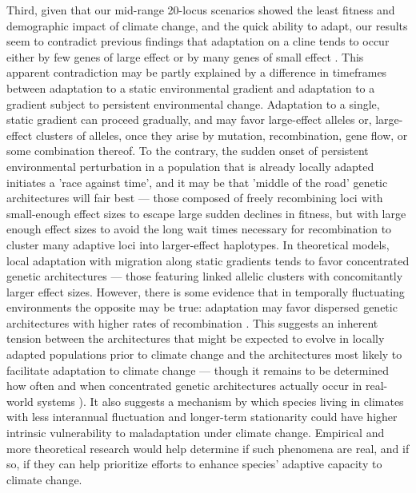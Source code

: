 \documentclass[9pt,twocolumn,twoside,lineno]{pnas-new}
\begin{document}
   
Third, given that our mid-range 20-locus scenarios
showed the least fitness and demographic impact of climate change,
and the quick ability to adapt,
our results seem to contradict previous findings that adaptation on a cline tends to 
occur either by few genes of large effect or by many genes of small effect 
\cite{yeaman_amnat,yeaman_review}. 
This apparent contradiction may be partly explained by a 
difference in timeframes between adaptation to a static environmental gradient
and adaptation to a gradient subject to persistent environmental change. 
Adaptation to a single, static gradient can proceed gradually,
and may favor large-effect alleles or, large-effect clusters of alleles,
once they arise by mutation, recombination, gene flow, or some combination thereof. 
To the contrary, the sudden onset of persistent environmental perturbation 
in a population that is already locally adapted initiates a 'race against time', 
and it may be that 'middle of the road' genetic architectures will fair 
best --- those composed of freely recombining loci with small-enough effect sizes to escape large
sudden declines in fitness, but with large enough effect sizes to avoid the long wait times necessary for recombination to cluster many adaptive loci into larger-effect haplotypes.
In theoretical models, local adaptation with migration along static 
gradients tends to favor concentrated genetic architectures ---
those featuring linked allelic clusters with concomitantly larger effect sizes.
However, there is some evidence that in temporally fluctuating environments the opposite may be true:
adaptation may favor dispersed genetic architectures with higher rates of recombination
\cite{burger,kondrashov,yeaman_review,yeaman_whitlock}.
This suggests an inherent tension between the architectures that
might be expected to evolve in locally adapted populations prior to climate change
and the architectures most likely to facilitate adaptation to climate change --- though it remains to be determined how 
often and when concentrated genetic architectures actually occur in 
real-world systems \cite{laruson}).
It also suggests a mechanism by which species living in climates with 
less interannual fluctuation and longer-term stationarity could have
higher intrinsic vulnerability to maladaptation under climate 
change. Empirical and more theoretical research
would help determine if such phenomena are real, and if so,
if they can help prioritize efforts to enhance species' adaptive capacity to climate change.
   
\end{document}
